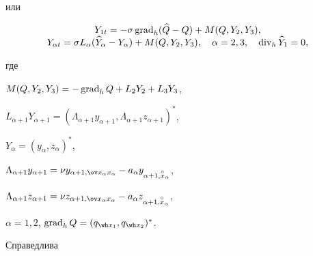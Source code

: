 или


\begin{equation}


\begin{array}{c}


Y_{1t}=-\sigma\Grad_h(\widehat Q-Q)+M(Q,Y_2,Y_3),\\


Y_{\alpha t}=\sigma L_\alpha(\widehat


Y_\alpha-Y_\alpha)+M(Q,Y_2,Y_3),\quad


\alpha=2,3,\quad \Div_h\widehat Y_1=0,


\end{array}


\end{equation}


где


$M(Q,Y_2,Y_3)=-\operatorname{grad}_hQ+L_2Y_2+L_3Y_3$,


$L_{\alpha+1}Y_{\alpha+1}=(\Lambda_{\alpha+1}y_{\alpha+1},


\Lambda_{\alpha+1}z_{\alpha+1})^*$,


$Y_{\alpha}=(y_\alpha,z_\alpha)^{*}$,


$\Lambda_{\alpha+1}y_{\alpha+1}=\nu y_{\alpha+1,\ov x_\alpha


x_\alpha}-a_\alpha y_{\alpha+1,\overset{\circ}{x}{}_\alpha}$,


$\Lambda_{\alpha+1}z_{\alpha+1}=\nu z_{\alpha+1,\ov x_\alpha


x_\alpha}-a_\alpha z_{\alpha+1,\overset{\circ}{x}{}_\alpha}$,


$\alpha=1,2$, $\Grad_hQ=(q_{\wh x_1},q_{\wh x_2})^*$.





Справедлива





